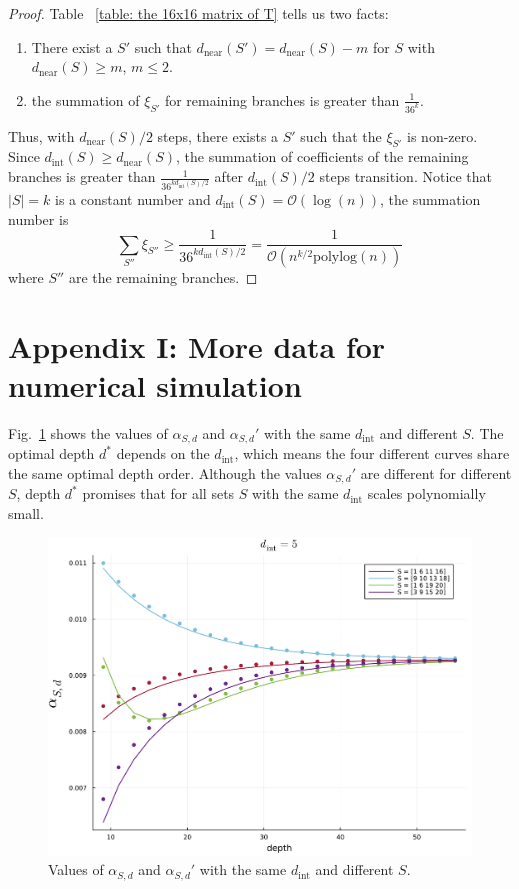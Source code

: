 \documentclass[journal=jctcce,a4paper,manuscript=article]{achemso}
\newcommand{\polylog}{\mathrm{polylog}}
\begin{document}
\begin{proof}
  Table ~\ref{table: the 16x16 matrix of T} tells us two facts:
  \begin{enumerate}
    \item There exist a $S'$ such that $d_\text{near}(S')= d_\text{near}(S)-m$ for $S$
          with $d_\text{near}(S) \geq m$, $m\leq 2$.
    \item the summation of $\xi_{S'}$ for remaining branches is greater than
          $\frac{1}{36^{k}}$.
  \end{enumerate}
  Thus, with $d_\text{near}(S)/2$ steps, there exists a $S'$ such that the $\xi_{S'}$ is non-zero. Since $d_\text{int}(S)\geq d_\text{near}(S)$, the summation of coefficients of the remaining branches is greater than $\frac{1}{36^{k d_\text{int}(S)/2}}$ after $d_\text{int}(S)/2$ steps transition. Notice that $|S| = k$ is a constant number and $d_\text{int}(S) = \mathcal{O}(\log(n))$, the summation number is
  \begin{equation}
    \sum_{S''} \xi_{S''} \geq  \frac{1}{36^{k d_\text{int}(S)/2}} = \frac{1}{\mathcal{O}(n^{k/2} \polylog(n))}
  \end{equation}
  where $S''$ are the remaining branches.
\end{proof}

\section{Appendix I: More data for numerical simulation}

Fig.~\ref{fig: fix dint} shows the values of $\alpha_{S,d}$ and $\alpha_{S,d}'$
with the same $d_\text{int}$ and different $S$. The optimal depth $d^\ast$
depends on the $d_\text{int}$, which means the four different curves share the
same optimal depth order. Although the values $\alpha_{S,d}'$ are different for
different $S$, depth $d^\ast$ promises that for all sets $S$ with the same
$d_\text{int}$ scales polynomially small.

\label{appendix: numerical simulation}

\begin{figure}
  \centering
  \includegraphics[width=0.8\linewidth]{figures/appendix/fix_dint.pdf}
  \caption{ Values of $\alpha_{S,d}$ and $\alpha_{S,d}'$ with the same $d_\text{int}$ and different $S$.}
  \label{fig: fix dint}
\end{figure}
\end{document}
